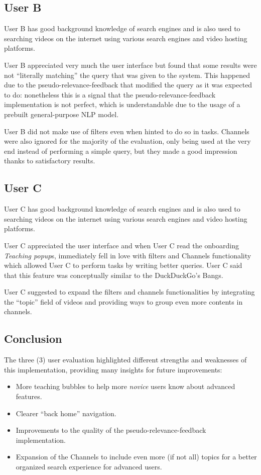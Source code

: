 \documentclass[12pt]{exam}
\begin{document}
\subsection{User B}

User B has good background knowledge of search engines and is also used to
searching videos on the internet using various search engines and video hosting
platforms.

User B appreciated very much the user interface but found that some results
were not ``literally matching'' the query that was given to the system. This
happened due to the pseudo-relevance-feedback that modified the query as it was
expected to do: nonetheless this is a signal that the pseudo-relevance-feedback
implementation is not perfect, which is understandable due to the usage of a
prebuilt general-purpose NLP model.

User B did not make use of filters even when hinted to do so in tasks. Channels
were also ignored for the majority of the evaluation, only being used at the
very end instead of performing a simple query, but they made a good impression
thanks to satisfactory results.

\subsection{User C}

User C has good background knowledge of search engines and is also used to
searching videos on the internet using various search engines and video hosting
platforms.

User C appreciated the user interface and when User C read the onboarding
\textit{Teaching popup}s, immediately fell in love with filters and Channels
functionality which allowed User C to perform tasks by writing better queries.
User C said that this feature was conceptually similar to the
DuckDuckGo's Bangs.

User C suggested to expand the filters and channels functionalities by 
integrating the ``topic'' field of videos and providing ways to group even more
contents in channels.

\subsection{Conclusion}

The three (3) user evaluation highlighted different strengths and weaknesses
of this implementation, providing many insights for future improvements:

\begin{itemize}
\item More teaching bubbles to help more \textit{novice} users know about
      advanced features.
\item Clearer ``back home'' navigation.
\item Improvements to the quality of the pseudo-relevance-feedback
      implementation.
\item Expansion of the Channels to include even more (if not all) topics
      for a better organized search experience for advanced users.
\end{itemize}
\end{document}
